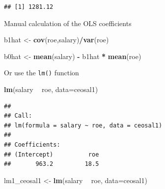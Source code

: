 \documentclass[]{book}
\newenvironment{Shaded}{\begin{snugshade}}{\end{snugshade}}
\newcommand{\DataTypeTok}[1]{\textcolor[rgb]{0.13,0.29,0.53}{#1}}
\newcommand{\KeywordTok}[1]{\textcolor[rgb]{0.13,0.29,0.53}{\textbf{#1}}}
\newcommand{\NormalTok}[1]{#1}
\newcommand{\OperatorTok}[1]{\textcolor[rgb]{0.81,0.36,0.00}{\textbf{#1}}}
\newcommand{\StringTok}[1]{\textcolor[rgb]{0.31,0.60,0.02}{#1}}
\begin{document}
\begin{verbatim}
## [1] 1281.12
\end{verbatim}

Manual calculation of the OLS coefficients

\begin{Shaded}
\begin{Highlighting}[]
\NormalTok{b1hat <-}\StringTok{ }\KeywordTok{cov}\NormalTok{(roe,salary)}\OperatorTok{/}\KeywordTok{var}\NormalTok{(roe)}
\end{Highlighting}
\end{Shaded}

\begin{Shaded}
\begin{Highlighting}[]
\NormalTok{b0hat <-}\StringTok{ }\KeywordTok{mean}\NormalTok{(salary) }\OperatorTok{-}\StringTok{ }\NormalTok{b1hat }\OperatorTok{*}\StringTok{ }\KeywordTok{mean}\NormalTok{(roe)}
\end{Highlighting}
\end{Shaded}

Or use the \texttt{lm()} function

\begin{Shaded}
\begin{Highlighting}[]
\KeywordTok{lm}\NormalTok{(salary }\OperatorTok{~}\StringTok{ }\NormalTok{roe, }\DataTypeTok{data=}\NormalTok{ceosal1)}
\end{Highlighting}
\end{Shaded}

\begin{verbatim}
## 
## Call:
## lm(formula = salary ~ roe, data = ceosal1)
## 
## Coefficients:
## (Intercept)          roe  
##       963.2         18.5
\end{verbatim}

\begin{Shaded}
\begin{Highlighting}[]
\NormalTok{lm1_ceosal1 <-}\StringTok{ }\KeywordTok{lm}\NormalTok{(salary }\OperatorTok{~}\StringTok{ }\NormalTok{roe, }\DataTypeTok{data=}\NormalTok{ceosal1) }
\end{Highlighting}
\end{Shaded}

\begin{Shaded}
\end{Shaded}
\end{document}
